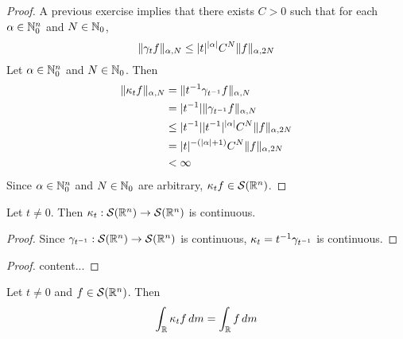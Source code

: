 \documentclass{book}
\begin{document}
	\begin{proof}
		A previous exercise implies that there exists $C > 0$ such that for each $\alpha \in \mathbb{N}_0^n$ and $N \in \mathbb{N}_0$, 
		$$\| \gamma_t f\|_{\alpha, N} \leq |t|^{|\alpha|} C^N\|f\|_{\alpha, 2N}$$
		Let $\alpha \in \mathbb{N}_0^n$ and $N \in \mathbb{N}_0$. Then
		\begin{align*}
			\|\kappa_t f\|_{\alpha, N}
			& = \|t^{-1} \gamma_{t^{-1}} f \|_{\alpha, N} \\
			& = |t^{-1}| \|\gamma_{t^{-1}} f \|_{\alpha, N} \\
			& \leq |t^{-1}| |t^{-1}|^{|\alpha|} C^N\|f\|_{\alpha, 2N} \\
			& = |t|^{-(|\alpha| + 1)} C^N \|f\|_{\alpha, 2N} \\
			& < \infty 
		\end{align*}
		Since $\alpha \in \mathbb{N}_0^n$ and $N \in \mathbb{N}_0$ are arbitrary, $\kappa_t f \in \mathcal{S}(\mathbb{R}^n)$.
	\end{proof}
	
	\begin{ex}
		Let $t \neq 0$. Then $\kappa_t: \mathcal{S}(\mathbb{R}^n) \rightarrow \mathcal{S}(\mathbb{R}^n)$ is continuous.
	\end{ex}
	
	\begin{proof} 
	Since $\gamma_{t^{-1}}: \mathcal{S}(\mathbb{R}^n) \rightarrow \mathcal{S}(\mathbb{R}^n)$ is continuous, $\kappa_t = t^{-1} \gamma_{t^{-1}}$ is continuous.
	\end{proof}

	\begin{ex}
	\end{ex}

	\begin{proof}
		content...
	\end{proof}


		\begin{ex}
		Let $t \neq 0$ and $f \in \mathcal{S}(\mathbb{R}^n)$. Then 
		$$\int_{\mathbb{R}} \kappa_t f \, d m  = \int_{\mathbb{R}} f \, d m$$
	\end{ex}
	
\end{document}
